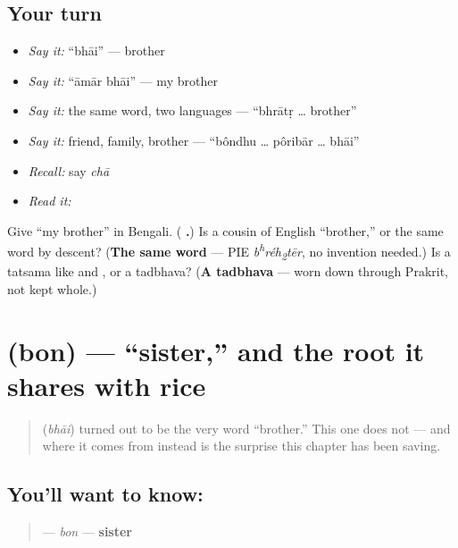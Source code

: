 \subsection*{Your turn}
\begin{itemize}
\raggedright
  \item \emph{Say it:} \textquotedblleft{}bhāi\textquotedblright{} — brother
  \item \emph{Say it:} \textquotedblleft{}āmār bhāi\textquotedblright{} — my brother
  \item \emph{Say it:} the same word, two languages — \textquotedblleft{}bhrātṛ … brother\textquotedblright{}
  \item \emph{Say it:} friend, family, brother — \textquotedblleft{}bôndhu … pôribār … bhāi\textquotedblright{}
  \item \emph{Recall:} say \emph{chā}
  \item \emph{Read it:} \textbf{}
\end{itemize}

\begin{tcolorbox}[breakable,colback=teal!4,colframe=teal!35!black,title={Before you move on}]
Give \textquotedblleft{}my brother\textquotedblright{} in Bengali. (\textbf{ .}) Is  a cousin of English \textquotedblleft{}brother,\textquotedblright{} or the same word by descent? (\textbf{The same word} — PIE \emph{b\textsuperscript{h}réh\textsubscript{2}tēr}, no invention needed.) Is  a tatsama like  and , or a tadbhava? (\textbf{A tadbhava} — worn down through Prakrit, not kept whole.)
\end{tcolorbox}
\section[\texorpdfstring{\bn{বোন} (bon)}{বোন (bon)}]{ (bon) — \textquotedblleft{}sister,\textquotedblright{} and the root it shares with rice}

\label{lesson:BN-C11-bon}



\begin{quote}
 (\emph{bhāi}) turned out to be the very word \textquotedblleft{}brother.\textquotedblright{} This one does not — and where it comes from instead is the surprise this chapter has been saving.
\end{quote}

\subsection*{You'll want to know: }
\begin{quote}
\textbf{} — \emph{bon} — \textbf{sister}
\end{quote}

